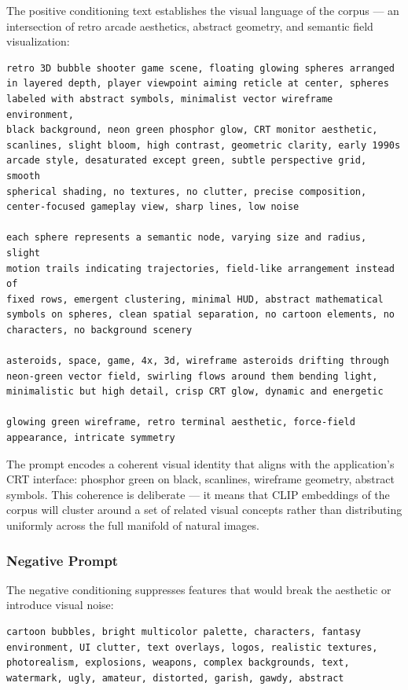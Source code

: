 \documentclass[12pt, a4paper]{article}
\begin{document}
The positive conditioning text establishes the visual language of the corpus --- an intersection of retro arcade aesthetics, abstract geometry, and semantic field visualization:

\begin{lstlisting}[language={},caption={Positive CLIPTextEncode prompt (node id:6)}]
retro 3D bubble shooter game scene, floating glowing spheres arranged 
in layered depth, player viewpoint aiming reticle at center, spheres 
labeled with abstract symbols, minimalist vector wireframe environment, 
black background, neon green phosphor glow, CRT monitor aesthetic, 
scanlines, slight bloom, high contrast, geometric clarity, early 1990s 
arcade style, desaturated except green, subtle perspective grid, smooth 
spherical shading, no textures, no clutter, precise composition, 
center-focused gameplay view, sharp lines, low noise

each sphere represents a semantic node, varying size and radius, slight 
motion trails indicating trajectories, field-like arrangement instead of 
fixed rows, emergent clustering, minimal HUD, abstract mathematical 
symbols on spheres, clean spatial separation, no cartoon elements, no 
characters, no background scenery

asteroids, space, game, 4x, 3d, wireframe asteroids drifting through 
neon-green vector field, swirling flows around them bending light, 
minimalistic but high detail, crisp CRT glow, dynamic and energetic

glowing green wireframe, retro terminal aesthetic, force-field 
appearance, intricate symmetry
\end{lstlisting}

The prompt encodes a coherent visual identity that aligns with the application's CRT interface: phosphor green on black, scanlines, wireframe geometry, abstract symbols. This coherence is deliberate --- it means that CLIP embeddings of the corpus will cluster around a set of related visual concepts rather than distributing uniformly across the full manifold of natural images.

\subsubsection{Negative Prompt}

The negative conditioning suppresses features that would break the aesthetic or introduce visual noise:

\begin{lstlisting}[language={},caption={Negative CLIPTextEncode prompt (node id:7)}]
cartoon bubbles, bright multicolor palette, characters, fantasy 
environment, UI clutter, text overlays, logos, realistic textures, 
photorealism, explosions, weapons, complex backgrounds, text, 
watermark, ugly, amateur, distorted, garish, gawdy, abstract
\end{lstlisting}
\end{document}
